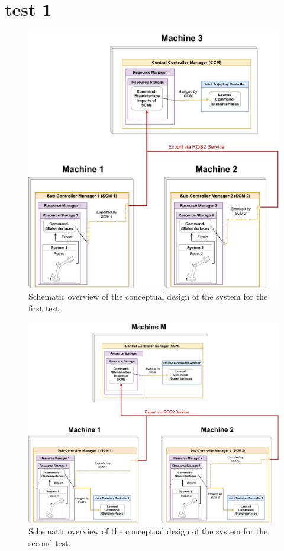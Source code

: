 \section{test 1}
\begin{figure}[htbp]
	\centering
	\includegraphics[width=1\textwidth]{Figures/c6/test_scenario_1.drawio.pdf}
	\caption{Schematic overview of the conceptual design of the system for the first test.}
	\label{c6_fig_test_scenario_1}
\end{figure}
\begin{figure}[htbp]
	\centering
	\includegraphics[width=1\textwidth]{Figures/c6/test_scenario_2.drawio.pdf}
	\caption{Schematic overview of the conceptual design of the system for the second test.}
	\label{c6_fig_test_scenario_2}
\end{figure}


